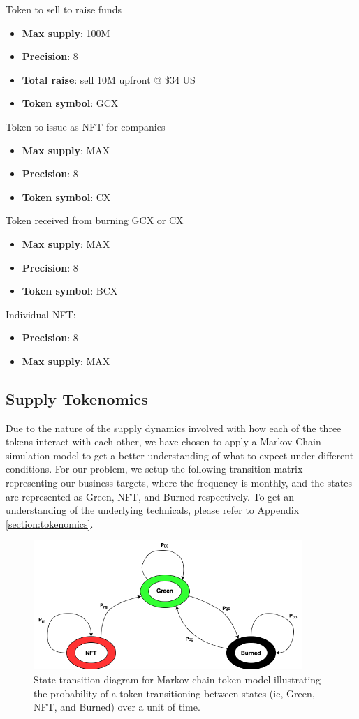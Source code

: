 \documentclass{article}
\begin{document}
Token to sell to raise funds
\begin{itemize}
\item \textbf{Max supply}: 100M
\item \textbf{Precision}: 8
\item \textbf{Total raise}: sell 10M upfront @ \$34 US
\item \textbf{Token symbol}: GCX
\end{itemize}

Token to issue as NFT for companies
\begin{itemize}
\item \textbf{Max supply}: MAX
\item \textbf{Precision}: 8
\item \textbf{Token symbol}: CX
\end{itemize}

Token received from burning GCX or CX
\begin{itemize}
\item \textbf{Max supply}: MAX
\item \textbf{Precision}: 8
\item \textbf{Token symbol}: BCX
\end{itemize}

Individual NFT:
\begin{itemize}
\item \textbf{Precision}: 8
\item \textbf{Max supply}: MAX
\end{itemize}

\subsection{Supply Tokenomics}
\label{section:token_model}

Due to the nature of the supply dynamics involved with how each of the three tokens interact with each other, we have chosen to apply a Markov Chain simulation model to get a better understanding of what to expect under different conditions. For our problem, we setup the following transition matrix representing our business targets, where the frequency is monthly, and the states are represented as Green, NFT, and Burned respectively. To get an understanding of the underlying technicals, please refer to Appendix \ref{section:tokenomics}.

\begin{figure}[h]
\centering
\includegraphics[width=4in]{state_diagram.png}
\caption{State transition diagram for Markov chain token model illustrating the probability of a token transitioning between states (ie, Green, NFT, and Burned) over a unit of time.} 
\label{fig:state_diagram}
\end{figure} 
\end{document}
